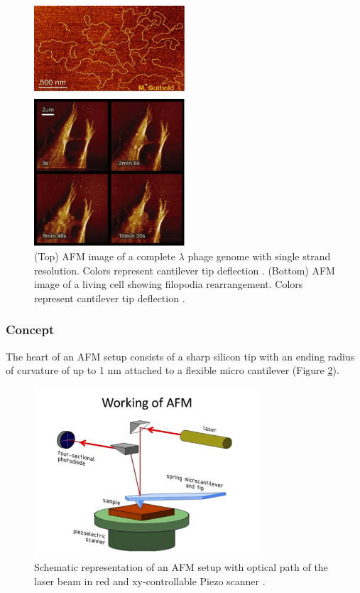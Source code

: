 \documentclass{article}
\begin{document}
\begin{figure}[htb]
\centering
\includegraphics[width = 0.5\textwidth]{Figure1}
\caption{(Top) AFM image of a complete $\lambda$ phage genome with single strand resolution. Colors represent cantilever tip deflection \cite{image11}. (Bottom) AFM image of a living cell showing filopodia rearrangement. Colors represent cantilever tip deflection \cite{image12}.}\label{fig: phage genome}
\end{figure}

\subsubsection{Concept}
The heart of an AFM setup consists of a sharp silicon tip with an ending radius of curvature of up to 1 nm attached to a flexible micro cantilever (Figure \ref{fig: afm setup}). 

\begin{figure}[htb!]
\centering
\includegraphics[width = 0.75\textwidth]{Figure2}
\caption{Schematic representation of an AFM setup with optical path of the laser beam in red and xy-controllable Piezo scanner \cite{image2}.} \label{fig: afm setup}
\end{figure}
\end{document}
